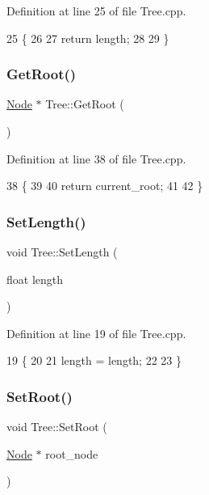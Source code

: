 Definition at line 25 of file Tree.\+cpp.


\begin{DoxyCode}
25                      \{
26   
27   \textcolor{keywordflow}{return} length;
28   
29 \}
\end{DoxyCode}
\mbox{\label{classTree_a866593b4b067b38394a090e0d57b132f}} 
\subsubsection{\texorpdfstring{Get\+Root()}{GetRoot()}}
{\footnotesize\ttfamily \hyperlink{classNode}{Node} $\ast$ Tree\+::\+Get\+Root (\begin{DoxyParamCaption}{ }\end{DoxyParamCaption})}



Definition at line 38 of file Tree.\+cpp.


\begin{DoxyCode}
38                    \{
39   
40   \textcolor{keywordflow}{return} current\_root;
41   
42 \}
\end{DoxyCode}
\mbox{\label{classTree_aa16a8485326ce51d6d7324f23066eb27}} 
\subsubsection{\texorpdfstring{Set\+Length()}{SetLength()}}
{\footnotesize\ttfamily void Tree\+::\+Set\+Length (\begin{DoxyParamCaption}\item[{float}]{length }\end{DoxyParamCaption})}



Definition at line 19 of file Tree.\+cpp.


\begin{DoxyCode}
19                                 \{
20 
21     length = length;
22   
23 \}
\end{DoxyCode}
\mbox{\label{classTree_ae592faa2c1f2da3cc1157bd9a4b884b5}} 
\subsubsection{\texorpdfstring{Set\+Root()}{SetRoot()}}
{\footnotesize\ttfamily void Tree\+::\+Set\+Root (\begin{DoxyParamCaption}\item[{\hyperlink{classNode}{Node} $\ast$}]{root\+\_\+node }\end{DoxyParamCaption})}



